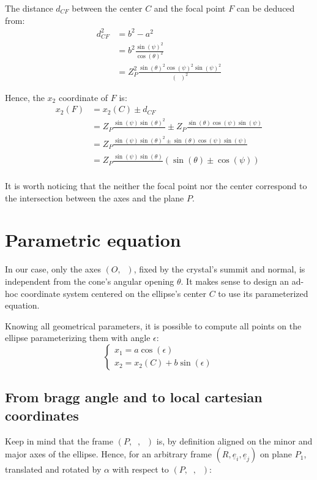 \documentclass[a4paper,11pt,twoside,titlepage,openright]{book}
\numberwithin{equation}{section}
\newcommand{\ud}[1]{\underline{#1}}
\newcommand{\lt}{\left}
\newcommand{\rt}{\right}
\DeclareMathOperator{\ei}{\underline{e}_1}
\DeclareMathOperator{\et}{\underline{e}_2}
\DeclareMathOperator{\ez}{\underline{e}_z}
\DeclareMathOperator{\DD}{\cos(\theta)^2 - \sin(\psi)^2}
\begin{document}
The distance $d_{CF}$ between the center $C$ and the focal point $F$ can be deduced from:
$$
\begin{array}{lll}
	d_{CF}^2 & = b^2-a^2\\
		& = b^2\frac{\sin(\psi)^2}{\cos(\theta)^2}\\
		& = Z_P^2\frac{\sin(\theta)^2\cos(\psi)^2\sin(\psi)^2}{\lt(\DD\rt)^2}
\end{array}
$$

Hence, the $x_2$ coordinate of $F$ is:
$$
\begin{array}{lll}
	x_2(F) & = x_2(C) \pm d_{CF}\\
	       & = Z_P\frac{\sin(\psi)\sin(\theta)^2}{\DD} \pm Z_P\frac{\sin(\theta)\cos(\psi)\sin(\psi)}{\DD}\\
	       & = Z_P\frac{\sin(\psi)\sin(\theta)^2 \pm \sin(\theta)\cos(\psi)\sin(\psi)}{\DD}\\
	       & = Z_P\frac{\sin(\psi)\sin(\theta)}{\DD}\lt(\sin(\theta) \pm \cos(\psi)\rt)\\
\end{array}
$$

It is worth noticing that the neither the focal point nor the center correspond to the intersection between the axes and the plane $P$.


\section{Parametric equation}

In our case, only the axes $(O, \ez)$, fixed by the crystal's summit and normal, is independent from the cone's angular opening $\theta$.
It makes sense to design an ad-hoc coordinate system centered on the ellipse's center $C$ to use its parameterized equation.

Knowing all geometrical parameters, it is possible to compute all points on the ellipse parameterizing them with angle $\epsilon$:
$$
\lt\{
	\begin{array}{lll}
		x_1 = a\cos(\epsilon)\\
		x_2 = x_2(C) + b\sin(\epsilon)
	\end{array}
\rt.
$$

\subsection{From bragg angle and to local cartesian coordinates}

Keep in mind that the frame $(P, \ei, \et)$ is, by definition aligned on the minor and major axes of the ellipse.
Hence, for an arbitrary frame $(R, \ud{e}_i, \ud{e}_j)$ on plane $P_1$, translated and rotated by $\alpha$ with respect to $(P, \ei, \et)$:
\end{document}
